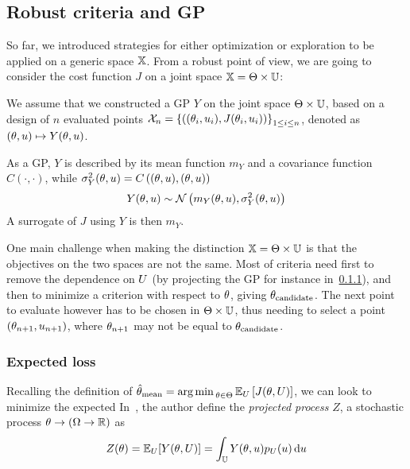 \documentclass[../../Main_ManuscritThese.tex]{subfiles}
\begin{document}
\subsection{Robust criteria and GP}
So far, we introduced strategies for either optimization or exploration to be applied on a generic space $\mathbb{X}$. From a robust point of view, we are going to consider the cost function $J$ on a joint space $\mathbb{X} = \Theta \times \mathbb{U}$:

We assume that we constructed a GP $Y$ on the joint space $\Theta \times \mathbb{U}$, based on a design of $n$ evaluated points $\mathcal{X}_n = \left\{\left((\theta_i,u_i),J(\theta_i, u_i) \right)\right\}_{1\leq i \leq n}$, denoted as $(\theta,u)\mapsto Y(\theta,u)$.

As a GP, $Y$ is described by its mean function $m_{Y}$ and a covariance function $C(\cdot, \cdot)$, while $\sigma^2_Y(\theta,u) = C\left((\theta,u), (\theta,u)\right)$
\begin{equation}
  Y(\theta,u) \sim \mathcal{N}\left(m_{Y}(\theta,u), \sigma^2_Y(\theta,u) \right)
\end{equation}
A surrogate of $J$ using $Y$ is then $m_Y$.

One main challenge when making the distinction $\mathbb{X} = \Theta \times \mathbb{U}$ is that the objectives on the two spaces are not the same. Most of criteria need first to remove the dependence on $U$ (by projecting the GP for instance in~\cref{ssec:expected_loss_GP_projection}), and then to minimize a criterion with respect to $\theta$, giving $\theta_{\mathrm{candidate}}$.
The next point to evaluate however has to be chosen in $\Theta \times \mathbb{U}$, thus needing to select a point $(\theta_{n+1}, u_{n+1})$, where $\theta_{n+1}$ may not be equal to $\theta_{\mathrm{candidate}}$.


\subsubsection{Expected loss}
\label{ssec:expected_loss_GP_projection}
Recalling the definition of $\hat{\theta}_{\mathrm{mean}} = \operatorname*{arg\,min \,}_{\theta \in \Theta} \mathbb{E}_{U}\left[J(\theta, U)\right]$, we can look to minimize the expected 
In~\cite{janusevskis_simultaneous_2010}, the author define the \emph{projected process} $Z$, a stochastic process $\theta \rightarrow \left(\Omega \rightarrow \mathbb{R}\right)$ as
\begin{equation}
  Z(\theta) = \mathbb{E}_U[Y(\theta, U)] = \int_{\mathbb{U}} Y(\theta, u) p_{U}(u)\,\mathrm{d}u
\end{equation}
\end{document}
